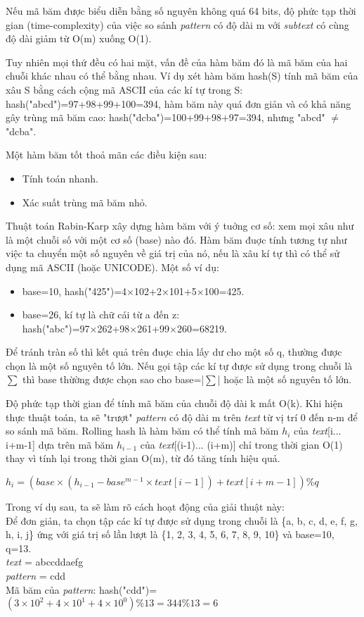 \documentclass[a4paper,11pt]{article}
\begin{document}
\begin{enumerate}
			Nếu mã băm được biểu diễn bằng số nguyên không quá 64 bits, độ phức tạp thời gian (time-complexity) 
			của việc so sánh \textit{pattern} có độ dài m với \textit{subtext} có cùng độ dài giảm từ O(m) xuống O(1).

			Tuy nhiên mọi thứ đều có hai mặt, vấn đề của hàm băm đó là mã băm của hai chuỗi khác nhau có thể bằng nhau. 
			Ví dụ xét hàm băm hash(S) tính mã băm của xâu S bằng cách cộng mã ASCII của các kí tự trong S: hash("abcd")=97+98+99+100=394, hàm băm này quá đơn giản và có khả năng gây trùng mã băm cao: hash("dcba")=100+99+98+97=394, nhưng "abcd" $\neq$ "dcba".

			Một hàm băm tốt thoả mãn các điều kiện sau:
			\begin{itemize}
				\item Tính toán nhanh.
				\item Xác suất trùng mã băm nhỏ.
			\end{itemize}

			Thuật toán Rabin-Karp xây dựng hàm băm với ý tuởng cơ số: xem mọi xâu như là một chuỗi số với một cơ số (base) nào đó. Hàm băm đuợc tính tương tự như việc ta chuyển một số nguyên về giá trị của nó, nếu là xâu kí tự thì có thể sử dụng mã ASCII (hoặc UNICODE). Một số ví dụ:
			\begin{itemize}
			\item base=10, hash("425")=4×102+2×101+5×100=425.
			\item base=26, kí tự là chữ cái từ a đến z: hash("abc")=97×262+98×261+99×260=68219.
			\end{itemize}
			Để tránh tràn số thì kết quả trên đuợc chia lấy dư cho một số q, thường được chọn là một số nguyên tố lớn. Nếu gọi tập các kí tự được sử dụng trong chuỗi là $\sum$ thì base thừờng được chọn sao cho base=|$\sum$| hoặc là một số nguyên tố lớn.

			Độ phức tạp thời gian để tính mã băm của chuỗi độ dài k mất O(k). Khi hiện thực thuật toán, ta sẽ "trượt" \textit{pattern} có độ dài m trên \textit{text} từ vị trí 0 đến n-m để so sánh mã băm. Rolling hash là hàm băm có thể tính mã băm $h_i$ của \textit{text}[i... i+m-1] dựa trên mã băm $h_{i-1}$ của \textit{text}[(i-1)... (i+m)] chỉ trong thời gian O(1) thay vì tính lại trong thời gian O(m), từ đó tăng tính hiệu quả.

			$h_i=(base\times(h_{i-1}-base^{m-1}\times\textit{text}[i-1])+\textit{text}[i+m-1]) \% q$

			Trong ví dụ sau, ta sẽ làm rõ cách hoạt động của giải thuật này:\\
			Để đơn giản, ta chọn tập các kí tự được sử dụng trong chuỗi là \{a, b, c, d, e, f, g, h, i, j\} ứng với giá trị số lần lượt là \{1, 2, 3, 4, 5, 6, 7, 8, 9, 10\} và base=10, q=13.\\
			\textit{text} \hspace*{6mm}= abccddaefg\\
			\textit{pattern} \hspace*{0.3mm}= cdd\\
			Mã băm của \textit{pattern}: hash("cdd")=$(3\times10^2+4\times10^1+4\times10^0) \% 13=344 \% 13=6$


\end{enumerate}
\end{document}
